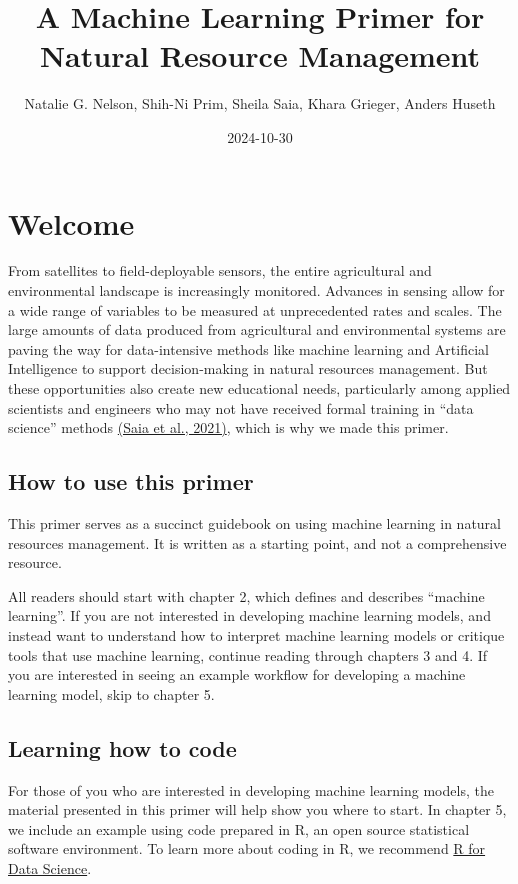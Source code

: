\documentclass[
]{book}
\title{A Machine Learning Primer for Natural Resource Management}
\author{Natalie G. Nelson, Shih-Ni Prim, Sheila Saia, Khara Grieger, Anders Huseth}
\date{2024-10-30}
\begin{document}
\maketitle

{
\setcounter{tocdepth}{1}
\tableofcontents
}
\hypertarget{welcome}{%
\chapter{Welcome}\label{welcome}}

From satellites to field-deployable sensors, the entire agricultural and environmental landscape is increasingly monitored. Advances in sensing allow for a wide range of variables to be measured at unprecedented rates and scales. The large amounts of data produced from agricultural and environmental systems are paving the way for data-intensive methods like machine learning and Artificial Intelligence to support decision-making in natural resources management. But these opportunities also create new educational needs, particularly among applied scientists and engineers who may not have received formal training in ``data science'' methods \href{https://doi.org/10.1016/j.ecolmodel.2020.109257}{(Saia et al., 2021)}, which is why we made this primer.

\hypertarget{how-to-use-this-primer}{%
\section{How to use this primer}\label{how-to-use-this-primer}}

This primer serves as a succinct guidebook on using machine learning in natural resources management. It is written as a starting point, and not a comprehensive resource.

All readers should start with chapter 2, which defines and describes ``machine learning''. If you are not interested in developing machine learning models, and instead want to understand how to interpret machine learning models or critique tools that use machine learning, continue reading through chapters 3 and 4. If you are interested in seeing an example workflow for developing a machine learning model, skip to chapter 5.

\hypertarget{learning-how-to-code}{%
\section{Learning how to code}\label{learning-how-to-code}}

For those of you who are interested in developing machine learning models, the material presented in this primer will help show you where to start. In chapter 5, we include an example using code prepared in R, an open source statistical software environment. To learn more about coding in R, we recommend \href{http://r4ds.hadley.nz/}{R for Data Science}.
\end{document}
